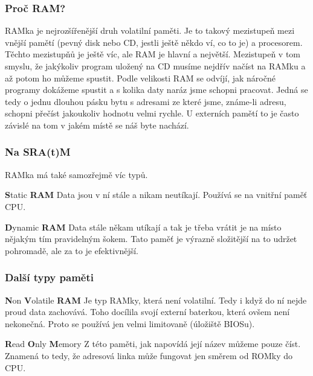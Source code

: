 \documentclass{beamer}
\begin{document}
\begin{frame}
	\frametitle{Proč RAM?}
	RAMka je nejrozšířenější druh volatilní paměti. Je to takový mezistupeň mezi vnější pamětí (pevný
	disk nebo CD, jestli ještě někdo ví, co to je) a procesorem. Těchto mezistupňů
	je ještě víc, ale RAM je hlavní a největší.
	\vfill
	Mezistupeň v tom smyslu, že jakýkoliv program uložený na CD musíme nejdřív
	načíst na RAMku a až potom ho můžeme spustit.
	\vfill
	Podle velikosti RAM se odvíjí, jak náročné programy dokážeme spustit a s
	kolika daty naráz jsme schopni pracovat.
	\vfill
	Jedná se tedy o jednu dlouhou pásku bytu s adresami ze které jsme, známe-li
	adresu, schopni přečíst jakoukoliv hodnotu velmi rychle. U externích pamětí to
	je často závislé na tom v jakém místě se náš byte nachází.
\end{frame}

\begin{frame}
 \frametitle{Na SRA(t)M}
 RAMka má také samozřejmě víc typů. 

 \begin{block}{\textbf{S}tatic \textbf{RAM}}
  Data jsou v ní stále a nikam neutíkají. Používá se na vnitřní paměť CPU.	
 \end{block}

 \begin{block}{\textbf{D}ynamic \textbf{RAM}}
Data stále někam utíkají a tak je třeba vrátit je na místo nějakým tím
pravidelným šokem. Tato paměť je výrazně složitější na to udržet pohromadě, ale
za to je efektivnější.
 \end{block}

\end{frame}

\begin{frame}
 \frametitle{Další typy paměti}

 \begin{block}{\textbf{N}on \textbf{V}olatile \textbf{RAM}}
Je typ RAMky, která není volatilní. Tedy i když do ní nejde proud data
zachovává. Toho docílila svojí externí baterkou, která ovšem není nekonečná.
Proto se používá jen velmi limitovaně (úložiště BIOSu).
 \end{block}

 \begin{block}{\textbf{R}ead \textbf{O}nly \textbf{M}emory}
  Z této paměti, jak napovídá její název můžeme pouze číst. Znamená to tedy, že
  adresová linka může fungovat jen směrem od ROMky do CPU.
 \end{block}
\end{frame}
\end{document}
